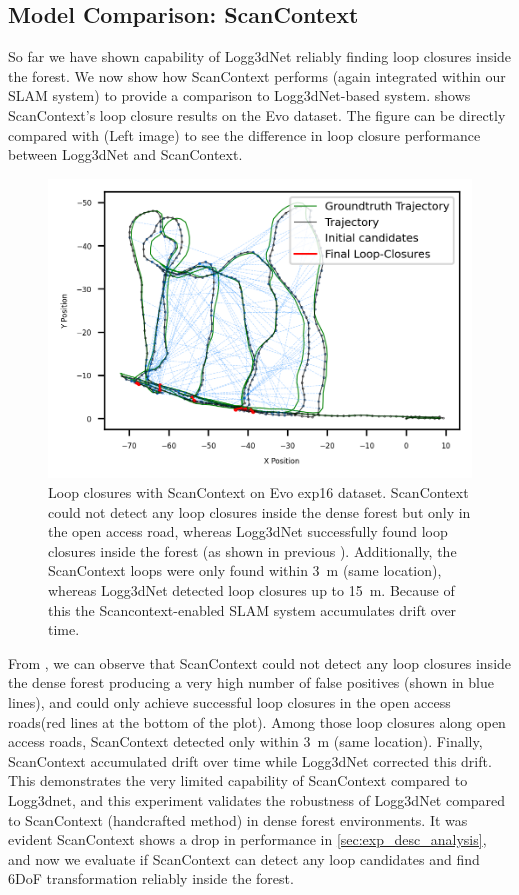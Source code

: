 \subsection*{Model Comparison: ScanContext}
So far we have shown capability of Logg3dNet reliably finding loop closures inside the forest. We now show how ScanContext performs (again integrated within  our SLAM system) to provide a comparison to Logg3dNet-based system.  shows ScanContext's loop closure results on the Evo dataset. The figure can be directly compared with  (Left image) to see the difference in loop closure performance between Logg3dNet and ScanContext.
\begin{figure}[htbp]
  \centering
  \includegraphics[width=0.75\columnwidth]{pics/exp_2_sc_loop_closure.png}
  \caption{Loop closures with ScanContext on Evo exp16 dataset. ScanContext could not detect any loop closures inside the dense forest but only in the open access road, whereas Logg3dNet successfully found loop closures inside the forest (as shown in previous ). Additionally, the ScanContext loops were only found within \SI{3}{\meter} (same location), whereas Logg3dNet detected loop closures up to \SI{15}{\meter}. Because of this the Scancontext-enabled SLAM system accumulates drift over time.}
  \label{fig:exp_2_3_loop_closure_comparison}
\end{figure}
From , we can observe that ScanContext could not detect any loop closures inside the dense forest producing a very high number of false positives (shown in blue lines), and could only achieve successful loop closures in the open access roads(red lines at the bottom of the plot). Among those loop closures along open access roads, ScanContext detected only within \SI{3}{\meter} (same location). Finally, ScanContext accumulated drift over time while Logg3dNet corrected this drift. This demonstrates the very limited capability of ScanContext compared to Logg3dnet, and this experiment validates the robustness of Logg3dNet compared to ScanContext (handcrafted method) in dense forest environments.
It was evident ScanContext shows a drop in performance in \ref{sec:exp_desc_analysis}, and now we evaluate if ScanContext can detect any loop candidates and find 6DoF transformation reliably inside the forest.  


